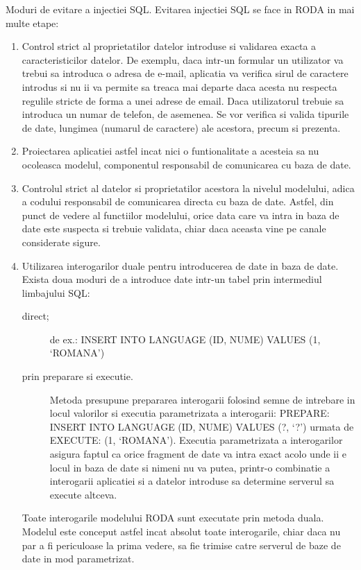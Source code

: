 {\sffamily\color{black}
Moduri de evitare a injectiei SQL. Evitarea injectiei SQL se face in RODA in mai multe etape:}
\begin{enumerate}
  \item 
Control strict al proprietatilor datelor introduse si validarea exacta a caracteristicilor datelor. De exemplu,
daca intr-un formular un utilizator va trebui sa introduca o adresa de e-mail, aplicatia va verifica sirul de caractere
introdus si nu ii va permite sa treaca mai departe daca acesta nu respecta regulile stricte de forma a unei adrese de
email. Daca utilizatorul trebuie sa introduca un numar de telefon, de asemenea. Se vor verifica si valida tipurile de
date, lungimea (numarul de caractere) ale acestora, precum si prezenta.
\item
Proiectarea aplicatiei astfel incat nici o funtionalitate a acesteia
sa nu ocoleasca modelul, componentul responsabil de comunicarea cu baza de date.
\item
Controlul strict al datelor si proprietatilor acestora la nivelul
modelului, adica a codului responsabil de comunicarea directa cu baza de date. Astfel, din punct de vedere al functiilor modelului, orice data care va intra in
baza de date este suspecta si trebuie validata, chiar daca aceasta vine pe canale considerate sigure.
\item
Utilizarea interogarilor duale pentru introducerea de date in baza
de date. Exista doua moduri de a introduce date intr-un tabel prin intermediul limbajului SQL:
\begin{description}
	\item [direct;] de ex.: INSERT INTO LANGUAGE (ID, NUME) VALUES (1,
`ROMANA')
	\item [prin preparare si executie.] Metoda presupune prepararea interogarii folosind
semne de intrebare in locul valorilor si executia parametrizata a interogarii: 
PREPARE: INSERT INTO LANGUAGE (ID, NUME) VALUES (?, `?') 
urmata de
EXECUTE: (1, `ROMANA'). 
Executia parametrizata a interogarilor asigura faptul ca orice fragment de date va intra exact
acolo unde ii e locul in baza de date si nimeni nu va putea, printr-o combinatie a interogarii aplicatiei si a datelor
introduse sa determine serverul sa execute altceva. 
\end{description}
Toate interogarile modelului RODA sunt executate prin metoda duala. Modelul este conceput astfel incat absolut toate
interogarile, chiar daca nu par a fi periculoase la prima vedere, sa fie trimise catre serverul de baze de date in mod
parametrizat.
\end{enumerate}

